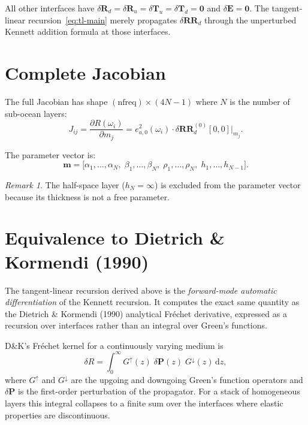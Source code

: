 \documentclass[11pt,a4paper]{article}
\newcommand{\dR}{\delta\mathbf{R}}
\newcommand{\dT}{\delta\mathbf{T}}
\newcommand{\dE}{\delta\mathbf{E}}
\newcommand{\dRR}{\delta\mathbf{RR}}
\newcommand{\dd}{\mathrm{d}}
\newcommand{\ppd}[2]{\frac{\partial #1}{\partial #2}}
\theoremstyle{plain}
\theoremstyle{remark}
\newtheorem{remark}{Remark}
\begin{document}
\noindent All other interfaces have
$\dR_d = \dR_u = \dT_u = \dT_d = \mathbf{0}$ and $\dE = \mathbf{0}$.
The tangent-linear recursion~\eqref{eq:tl-main} merely propagates $\dRR_d$
through the unperturbed Kennett addition formula at those interfaces.

\section{Complete Jacobian}\label{sec:jacobian}

The full Jacobian has shape $(\text{nfreq}) \times (4N{-}1)$ where $N$ is the
number of sub-ocean layers:
\begin{equation}\label{eq:Jij}
  J_{ij}
  = \ppd{R(\omega_i)}{m_j}
  = e_{a,0}^2(\omega_i) \cdot \dRR_d^{(0)}[0,0]\bigg|_{m_j}.
\end{equation}

The parameter vector is:
\begin{equation}\label{eq:params}
  \mathbf{m}
  = \bigl[\alpha_1,\dotsc,\alpha_N,\;
          \beta_1,\dotsc,\beta_N,\;
          \rho_1,\dotsc,\rho_N,\;
          h_1,\dotsc,h_{N-1}\bigr].
\end{equation}

\begin{remark}
The half-space layer ($h_N = \infty$) is excluded from the parameter vector
because its thickness is not a free parameter.
\end{remark}

\section{Equivalence to Dietrich \& Kormendi (1990)}\label{sec:DK}

The tangent-linear recursion derived above is the \emph{forward-mode automatic
differentiation} of the Kennett recursion.  It computes the exact same quantity
as the Dietrich \& Kormendi (1990) analytical Fréchet derivative, expressed as
a recursion over interfaces rather than an integral over Green's functions.

D\&K's Fréchet kernel for a continuously varying medium is
\begin{equation}\label{eq:DK-integral}
  \delta R = \int_0^\infty G^{\uparrow}(z)\;\delta\mathbf{P}(z)\;
  G^{\downarrow}(z)\,\dd z,
\end{equation}
where $G^{\uparrow}$ and $G^{\downarrow}$ are the upgoing and downgoing
Green's function operators and $\delta\mathbf{P}$ is the first-order
perturbation of the propagator.  For a stack of homogeneous layers this
integral collapses to a finite sum over the interfaces where elastic
properties are discontinuous.
\end{document}
